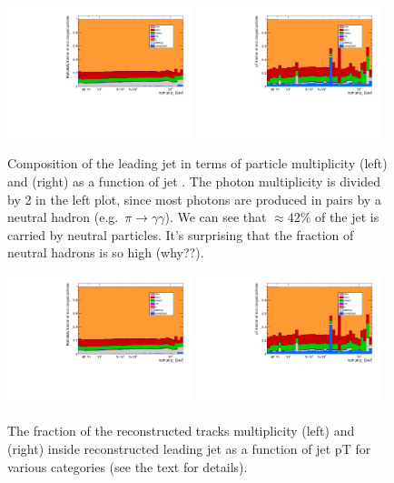 \begin{figure}[b]
	\centering
	\includegraphics[width=0.48\textwidth,page=3]{figures/jet_comp_study_powheg_Tight_MultiplicityFraction.pdf}
	\includegraphics[width=0.48\textwidth,page=3]{figures/jet_comp_study_powheg_Tight_pTFraction.pdf}
	\caption{Composition of the leading jet in terms of particle multiplicity (left) and \pt{} (right) as a function of jet \pt{}.
		The photon multiplicity is divided by 2 in the left plot, since most photons are produced in pairs by a neutral hadron (e.g.\ $\pi\to\gamma\gamma$).
		We can see that $\approx 42$\% of the jet \pt{} is carried by neutral particles. It's surprising that the fraction of neutral hadrons is so high (why??).}
	\label{fig:truthJetComp}
\end{figure}


\begin{figure}
\centering
\includegraphics[width=0.48\textwidth,page=1]{figures/jet_comp_study_powheg_Tight_MultiplicityFraction.pdf}
\includegraphics[width=0.48\textwidth,page=1]{figures/jet_comp_study_powheg_Tight_pTFraction.pdf}
\caption {The fraction of the reconstructed tracks multiplicity (left) and \pT (right) inside reconstructed leading jet as a function of jet pT for various categories (see the text for details).}
\label{fig:fraction of charged particles in reco jet}
\end{figure}


